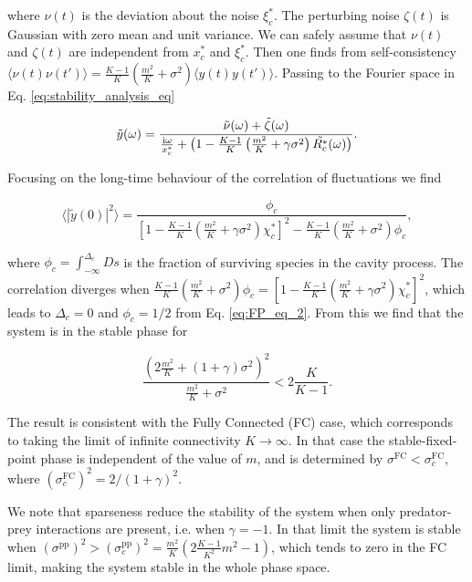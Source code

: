 \documentclass[
    preprint,
    linenumbers,
    amsmath,amssymb,amsfonts,
    aps, physrev,
    superscriptaddress,
    10pt,
    bibnotes
    ]{revtex4-2}
\begin{document}
where $\nu(t)$ is the deviation about the noise $\xi_{c}^{*}$. The
perturbing noise $\zeta(t)$ is Gaussian with zero mean and unit variance.
We can safely assume that $\nu(t)$ and $\zeta(t)$ are independent
from $x_{c}^{*}$ and $\xi_{c}^{*}$. Then one finds from self-consistency
$\langle\nu(t)\nu(t')\rangle=\frac{K-1}{K}(\frac{m^{2}}{K}+\sigma^{2})\langle y(t)y(t')\rangle$.
Passing to the Fourier space in Eq. \eqref{eq:stability_analysis_eq}

\begin{equation}
\tilde{y}(\omega)=\frac{\tilde{\nu}(\omega)+\tilde{\zeta}(\omega)}{\frac{{\rm i}\omega}{x_{c}^{*}}+\left(1-\frac{K-1}{K}\left(\frac{m^{2}}{K}+\gamma\sigma^{2}\right)\tilde{R_{c}^{*}}(\omega)\right)}.
\end{equation}

Focusing on the long-time behaviour of the correlation of fluctuations
we find

\begin{equation}
\langle\left|\tilde{y}(0)\right|^{2}\rangle=\frac{\phi_{c}}{\left[1-\frac{K-1}{K}\left(\frac{m^{2}}{K}+\gamma\sigma^{2}\right)\chi_{c}^{*}\right]^{2}-\frac{K-1}{K}\left(\frac{m^{2}}{K}+\sigma^{2}\right)\phi_{c}},
\end{equation}

where $\phi_{c}=\int_{-\infty}^{\Delta_{c}}Ds$ is the fraction of
surviving species in the cavity process. The correlation diverges
when $\frac{K-1}{K}\left(\frac{m^{2}}{K}+\sigma^{2}\right)\phi_{c}=\left[1-\frac{K-1}{K}\left(\frac{m^{2}}{K}+\gamma\sigma^{2}\right)\chi_{c}^{*}\right]^{2}$,
which leads to $\Delta_{c}=0$ and $\phi_{c}=1/2$ from Eq. \eqref{eq:FP_eq_2}.
From this we find that the system is in the stable phase for 

\begin{equation}
\frac{\left(2\frac{m^{2}}{K}+(1+\gamma)\sigma^{2}\right)^{2}}{\frac{m^{2}}{K}+\sigma^{2}}<2\frac{K}{K-1}.
\end{equation}

The result is consistent with the Fully Connected (FC) case, which
corresponds to taking the limit of infinite connectivity $K\to\infty$.
In that case the stable-fixed-point phase is independent of the value
of $m$, and is determined by $\sigma^{\text{FC}}<\sigma_{c}^{\text{FC}}$,
where $\left(\sigma_{c}^{\text{FC}}\right)^{2}=2/(1+\gamma)^{2}$.

We note that sparseness reduce the stability of the system when only
predator-prey interactions are present, i.e. when $\gamma=-1$. In
that limit the system is stable when $\left(\sigma^{\text{pp}}\right)^{2}>\left(\sigma_{c}^{\text{pp}}\right)^{2}=\frac{m^{2}}{K}\left(2\frac{K-1}{K^{2}}m^{2}-1\right)$,
which tends to zero in the FC limit, making the system stable in the
whole phase space.
\end{document}
